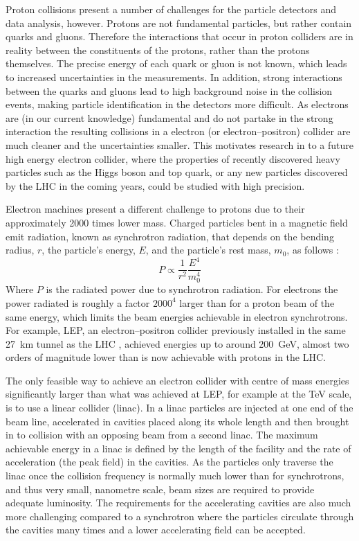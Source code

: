 Proton collisions present a number of challenges for the particle detectors and data analysis, however. Protons are not fundamental particles, but rather contain quarks and gluons. Therefore the interactions that occur in proton colliders are in reality between the constituents of the protons, rather than the protons themselves. The precise energy of each quark or gluon is not known, which leads to increased uncertainties in the measurements. In addition, strong interactions between the quarks and gluons lead to high background noise in the collision events, making particle identification in the detectors more difficult. As electrons are (in our current knowledge) fundamental and do not partake in the strong interaction the resulting collisions in a electron (or electron--positron) collider are much cleaner and the uncertainties smaller. This motivates research in to a future high energy electron collider, where the properties of recently discovered heavy particles such as the Higgs boson and top quark, or any new particles discovered by the LHC in the coming years, could be studied with high precision. 

Electron machines present a different challenge to protons due to their approximately 2000 times lower mass. Charged particles bent in a magnetic field emit radiation, known as synchrotron radiation, that depends on the bending radius, \(r\), the particle's energy, \(E\), and the particle's rest mass, \(m_0\), as follows \cite{wilson}:
\begin{equation}
P \propto \frac{1}{r^2} \frac{E^4}{m_0^4}
\end{equation}
Where \(P\) is the radiated power due to synchrotron radiation. For electrons the power radiated is roughly a factor \(2000^4\) larger than for a proton beam of the same energy, which limits the beam energies achievable in electron synchrotrons. For example, LEP, an electron--positron collider previously installed in the same 27~km tunnel as the LHC \cite{LEP}, achieved energies up to around 200~GeV, almost two orders of magnitude lower than is now achievable with protons in the LHC.

The only feasible way to achieve an electron collider with centre of mass energies significantly larger than what was achieved at LEP, for example at the TeV scale, is to use a linear collider (linac). In a linac particles are injected at one end of the beam line, accelerated in cavities placed along its whole length and then brought in to collision with an opposing beam from a second linac. The maximum achievable energy in a linac is defined by the length of the facility and the rate of acceleration (the peak field) in the cavities. As the particles only traverse the linac once the collision frequency is normally much lower than for synchrotrons, and thus very small, nanometre scale, beam sizes are required to provide adequate luminosity. The requirements for the accelerating cavities are also much more challenging compared to a synchrotron where the particles circulate through the cavities many times and a lower accelerating field can be accepted.

